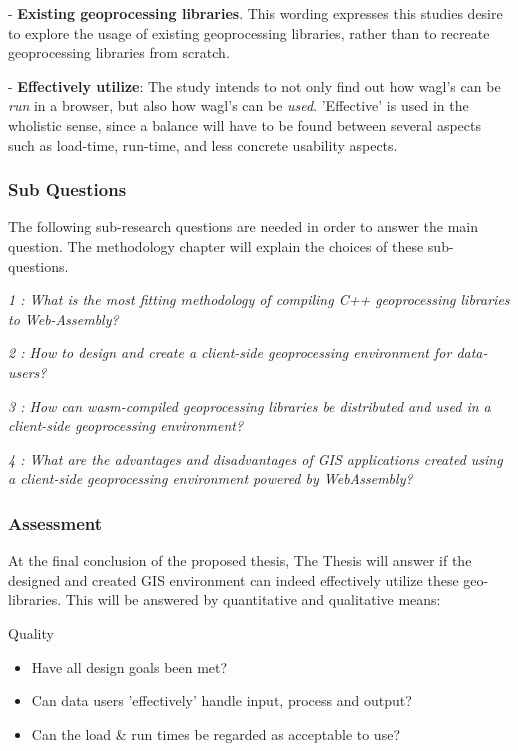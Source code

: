 - \textbf{Existing geoprocessing libraries}. This wording expresses this studies desire to explore the usage of existing geoprocessing libraries, rather than to recreate geoprocessing libraries from scratch.

- \textbf{Effectively utilize}: The study intends to not only find out how \ac{wagl}'s can be \textit{run} in a browser, but also how \ac{wagl}'s can be \textit{used}. 'Effective' is used in the wholistic sense, since a balance will have to be found between several aspects such as load-time, run-time, and less concrete usability aspects. 


\subsubsection*{Sub Questions}

The following sub-research questions are needed in order to answer the main question. The methodology chapter will explain the choices of these sub-questions. 

\textit{1 : What is the most fitting methodology of compiling C++ geoprocessing   libraries to Web-Assembly?}

\textit{2 : How to design and create a client-side geoprocessing environment for data-users?}

\textit{3 : How can wasm-compiled geoprocessing libraries be distributed and used in a client-side geoprocessing environment?}

\textit{4 : What are the advantages and disadvantages of GIS applications created using a client-side geoprocessing environment powered by WebAssembly?}

\newpage
\subsubsection*{Assessment}

At the final conclusion of the proposed thesis, The Thesis will answer if the designed and created GIS environment can indeed effectively utilize these geo-libraries.
This will be answered by quantitative and qualitative means:

Quality
\begin{itemize}
    \item Have all design goals been met?
    \item Can data users 'effectively' handle input, process and output?
    \item Can the load \& run times be regarded as acceptable to use? 
\end{itemize} 

